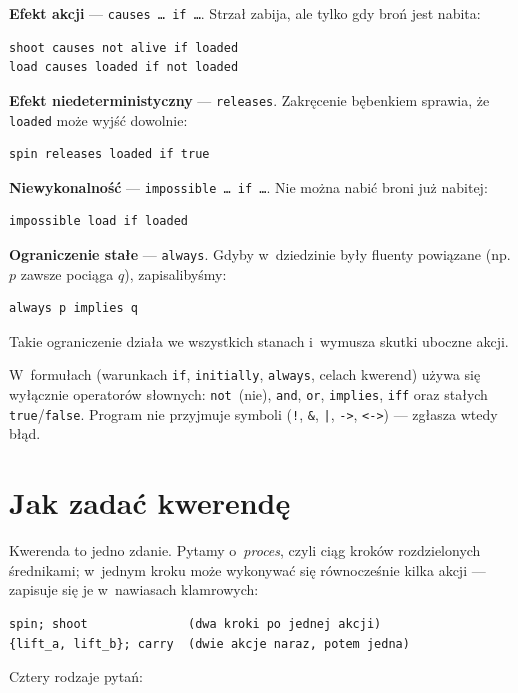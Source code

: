 \documentclass[11pt,a4paper]{article}
\begin{document}
\textbf{Efekt akcji} --- \texttt{causes \dots\ if \dots}. Strzał zabija,
ale tylko gdy broń jest nabita:
\begin{verbatim}
shoot causes not alive if loaded
load causes loaded if not loaded
\end{verbatim}

\textbf{Efekt niedeterministyczny} --- \texttt{releases}. Zakręcenie bębenkiem
sprawia, że \texttt{loaded} może wyjść dowolnie:
\begin{verbatim}
spin releases loaded if true
\end{verbatim}

\textbf{Niewykonalność} --- \texttt{impossible \dots\ if \dots}. Nie można
nabić broni już nabitej:
\begin{verbatim}
impossible load if loaded
\end{verbatim}

\textbf{Ograniczenie stałe} --- \texttt{always}. Gdyby w~dziedzinie były
fluenty powiązane (np. $p$ zawsze pociąga $q$), zapisalibyśmy:
\begin{verbatim}
always p implies q
\end{verbatim}
Takie ograniczenie działa we wszystkich stanach i~wymusza skutki uboczne
akcji.

W~formułach (warunkach \texttt{if}, \texttt{initially}, \texttt{always},
celach kwerend) używa się wyłącznie operatorów słownych: \texttt{not}~(nie),
\texttt{and}, \texttt{or}, \texttt{implies}, \texttt{iff} oraz stałych
\texttt{true}/\texttt{false}. Program nie przyjmuje symboli
(\texttt{!}, \texttt{\&}, \texttt{|}, \texttt{->}, \texttt{<->}) --- zgłasza wtedy błąd.

\section{Jak zadać kwerendę}
\label{sec:kwerenda}

Kwerenda to jedno zdanie. Pytamy o~\emph{proces}, czyli ciąg kroków
rozdzielonych średnikami; w~jednym kroku może wykonywać się równocześnie
kilka akcji --- zapisuje się je w~nawiasach klamrowych:

\begin{verbatim}
spin; shoot              (dwa kroki po jednej akcji)
{lift_a, lift_b}; carry  (dwie akcje naraz, potem jedna)
\end{verbatim}

Cztery rodzaje pytań:
\end{document}
